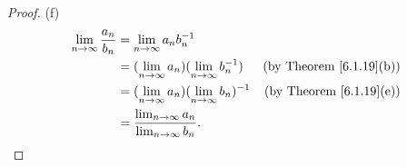\begin{proof}{(f)}
    \begin{align*}
        \lim_{n \to \infty} \frac{a_n}{b_n} & = \lim_{n \to \infty} a_n b_n^{-1}                                                               \\
                                            & = (\lim_{n \to \infty} a_n)(\lim_{n \to \infty} b_n^{-1})  & \text{(by Theorem \ref{6.1.19}(b))} \\
                                            & = (\lim_{n \to \infty} a_n)(\lim_{n \to \infty} b_n)^{-1}  & \text{(by Theorem \ref{6.1.19}(e))} \\
                                            & = \frac{\lim_{n \to \infty} a_n}{\lim_{n \to \infty} b_n}.
    \end{align*}
\end{proof}

